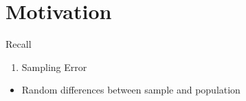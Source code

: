 \section{Motivation}\label{motivation}

\begin{frame}{Recall}

\begin{enumerate}
\def\labelenumi{\arabic{enumi}.}
\tightlist
\item
  Sampling Error
\end{enumerate}

\begin{itemize}
\tightlist
\item
  Random differences between sample and population
\end{itemize}

\end{frame}
